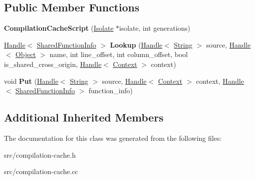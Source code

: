 \subsection*{Public Member Functions}
\begin{DoxyCompactItemize}
\item 
\hypertarget{classv8_1_1internal_1_1_compilation_cache_script_aabe1ee606027fc5b1fbff216c090ae4f}{}{\bfseries Compilation\+Cache\+Script} (\hyperlink{classv8_1_1internal_1_1_isolate}{Isolate} $\ast$isolate, int generations)\label{classv8_1_1internal_1_1_compilation_cache_script_aabe1ee606027fc5b1fbff216c090ae4f}

\item 
\hypertarget{classv8_1_1internal_1_1_compilation_cache_script_a65e67eb73bac8c2e269597af8d19b3ed}{}\hyperlink{classv8_1_1internal_1_1_handle}{Handle}$<$ \hyperlink{classv8_1_1internal_1_1_shared_function_info}{Shared\+Function\+Info} $>$ {\bfseries Lookup} (\hyperlink{classv8_1_1internal_1_1_handle}{Handle}$<$ \hyperlink{classv8_1_1internal_1_1_string}{String} $>$ source, \hyperlink{classv8_1_1internal_1_1_handle}{Handle}$<$ \hyperlink{classv8_1_1internal_1_1_object}{Object} $>$ name, int line\+\_\+offset, int column\+\_\+offset, bool is\+\_\+shared\+\_\+cross\+\_\+origin, \hyperlink{classv8_1_1internal_1_1_handle}{Handle}$<$ \hyperlink{classv8_1_1internal_1_1_context}{Context} $>$ context)\label{classv8_1_1internal_1_1_compilation_cache_script_a65e67eb73bac8c2e269597af8d19b3ed}

\item 
\hypertarget{classv8_1_1internal_1_1_compilation_cache_script_a73ae3ff089a3d86d6d62e2300bbb6719}{}void {\bfseries Put} (\hyperlink{classv8_1_1internal_1_1_handle}{Handle}$<$ \hyperlink{classv8_1_1internal_1_1_string}{String} $>$ source, \hyperlink{classv8_1_1internal_1_1_handle}{Handle}$<$ \hyperlink{classv8_1_1internal_1_1_context}{Context} $>$ context, \hyperlink{classv8_1_1internal_1_1_handle}{Handle}$<$ \hyperlink{classv8_1_1internal_1_1_shared_function_info}{Shared\+Function\+Info} $>$ function\+\_\+info)\label{classv8_1_1internal_1_1_compilation_cache_script_a73ae3ff089a3d86d6d62e2300bbb6719}

\end{DoxyCompactItemize}
\subsection*{Additional Inherited Members}


The documentation for this class was generated from the following files\+:\begin{DoxyCompactItemize}
\item 
src/compilation-\/cache.\+h\item 
src/compilation-\/cache.\+cc\end{DoxyCompactItemize}
